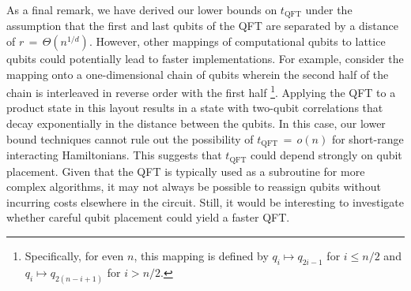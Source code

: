 As a final remark, we have derived our lower bounds on $t_\textrm{QFT}$ under the assumption that the first and last qubits of the QFT are separated by a distance of $r$\,$=$\,$\Theta(n^{1/d})$.
However, other mappings of computational qubits to lattice qubits could potentially lead to faster implementations.
For example, consider the mapping onto a one-dimensional chain of qubits wherein the second half of the chain is interleaved in reverse order with the first half \footnote{Specifically, for even $n$, this mapping is defined by $q_i\mapsto q_{2i-1}$ for $i \le n/2$ and $q_i\mapsto q_{2(n-i+1)}$ for $i > n/2$.}.
Applying the QFT to a product state in this layout results in a state with two-qubit correlations that decay exponentially in the distance between the qubits.
In this case, our lower bound techniques cannot rule out the possibility of $t_\textrm{QFT}$\,$=$\,$o(n)$ for short-range interacting Hamiltonians.
This suggests that $t_\textrm{QFT}$ could depend strongly on qubit placement.
Given that the QFT is typically used as a subroutine for more complex algorithms, it may not always be possible to reassign qubits without incurring costs elsewhere in the circuit.
Still, it would be interesting to investigate whether careful qubit placement could yield a faster QFT.
